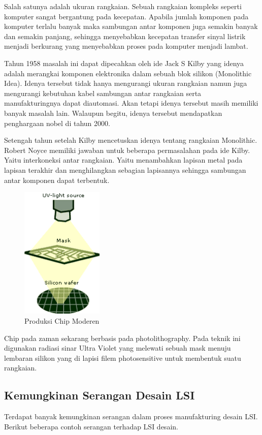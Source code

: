 Salah satunya adalah ukuran rangkaian. Sebuah rangkaian kompleks seperti komputer sangat bergantung pada kecepatan. Apabila jumlah komponen pada komputer terlalu banyak maka sambungan antar komponen juga semakin banyak dan semakin panjang, sehingga menyebabkan kecepatan transfer sinyal listrik menjadi berkurang yang menyebabkan proses pada komputer menjadi lambat.

Tahun 1958 masalah ini dapat dipecahkan oleh ide Jack S Kilby yang idenya adalah merangkai komponen elektronika dalam sebuah blok silikon (Monolithic Idea). Idenya tersebut tidak hanya mengurangi ukuran rangkaian namun juga mengurangi kebutuhan kabel sambungan antar rangkaian serta manufakturingnya dapat diautomasi. Akan tetapi idenya tersebut masih memiliki banyak masalah lain. Walaupun begitu, idenya tersebut mendapatkan penghargaan nobel di tahun 2000.

Setengah tahun setelah Kilby mencetuskan idenya tentang rangkaian Monolithic. Robert Noyce memiliki jawaban untuk beberapa permasalahan pada ide Kilby. Yaitu interkoneksi antar rangkaian. Yaitu menambahkan lapisan metal pada lapisan terakhir dan menghilangkan sebagian lapisannya sehingga sambungan antar komponen dapat terbentuk.

\begin{figure}
	\centering
	\includegraphics[width=0.35\textwidth]
	{pics/steping.png}
	\caption{Produksi Chip Moderen}
	\label{fig:produksiChipModeren}
\end{figure}

Chip pada zaman sekarang berbasis pada photolithography. Pada teknik ini digunakan radiasi sinar Ultra Violet yang melewati sebuah mask menuju lembaran silikon yang di lapisi filem photosensitive untuk membentuk suatu rangkaian.

\subsection{Kemungkinan Serangan Desain LSI}
Terdapat banyak kemungkinan serangan dalam proses manufakturing desain LSI. Berikut beberapa contoh serangan terhadap LSI desain.

